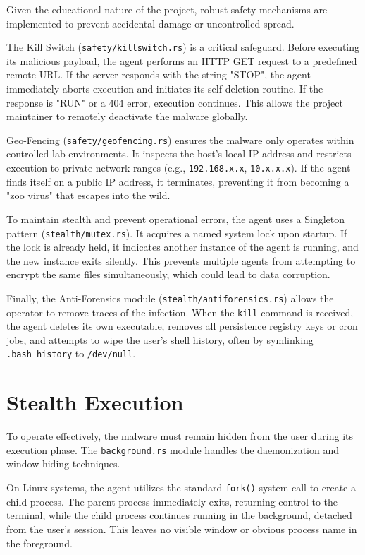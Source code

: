 \documentclass[12pt,a4paper]{article}
\newcommand{\code}[1]{\texttt{\textcolor{primaryblue}{#1}}}
\begin{document}
Given the educational nature of the project, robust safety mechanisms are implemented to prevent accidental damage or uncontrolled spread.

The Kill Switch (\code{safety/killswitch.rs}) is a critical safeguard. Before executing its malicious payload, the agent performs an HTTP GET request to a predefined remote URL. If the server responds with the string "STOP", the agent immediately aborts execution and initiates its self-deletion routine. If the response is "RUN" or a 404 error, execution continues. This allows the project maintainer to remotely deactivate the malware globally.

Geo-Fencing (\code{safety/geofencing.rs}) ensures the malware only operates within controlled lab environments. It inspects the host's local IP address and restricts execution to private network ranges (e.g., \code{192.168.x.x}, \code{10.x.x.x}). If the agent finds itself on a public IP address, it terminates, preventing it from becoming a "zoo virus" that escapes into the wild.

To maintain stealth and prevent operational errors, the agent uses a Singleton pattern (\code{stealth/mutex.rs}). It acquires a named system lock upon startup. If the lock is already held, it indicates another instance of the agent is running, and the new instance exits silently. This prevents multiple agents from attempting to encrypt the same files simultaneously, which could lead to data corruption.

Finally, the Anti-Forensics module (\code{stealth/antiforensics.rs}) allows the operator to remove traces of the infection. When the \code{kill} command is received, the agent deletes its own executable, removes all persistence registry keys or cron jobs, and attempts to wipe the user's shell history, often by symlinking \code{.bash\_history} to \code{/dev/null}.

\section{Stealth Execution}

To operate effectively, the malware must remain hidden from the user during its execution phase. The \code{background.rs} module handles the daemonization and window-hiding techniques.

On Linux systems, the agent utilizes the standard \code{fork()} system call to create a child process. The parent process immediately exits, returning control to the terminal, while the child process continues running in the background, detached from the user's session. This leaves no visible window or obvious process name in the foreground.
\end{document}
